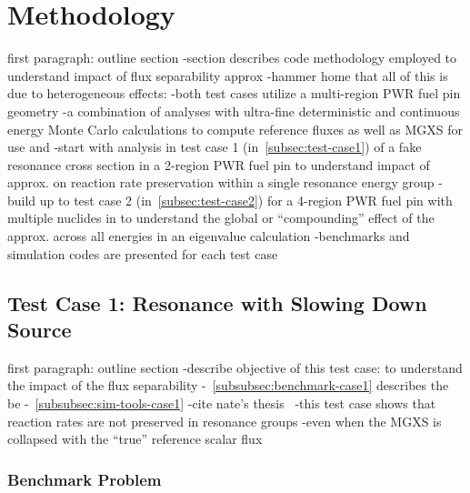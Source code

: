 \section{Methodology}
\label{sec:methodology}

first paragraph: outline section
-section describes code methodology employed to understand impact of flux separability approx 
-hammer home that all of this is due to heterogeneous effects:
  -both test cases utilize a multi-region PWR fuel pin geometry
-a combination of analyses with ultra-fine deterministic and continuous energy Monte Carlo calculations to compute reference fluxes as well as MGXS for use and
-start with analysis in test case 1 (in~\autoref{subsec:test-case1}) of a fake resonance cross section in a 2-region PWR fuel pin to understand impact of approx. on reaction rate preservation within a single resonance energy group
-build up to test case 2 (in~\autoref{subsec:test-case2}) for a 4-region PWR fuel pin with multiple nuclides in to understand the global or ``compounding'' effect of the approx. across all energies in an eigenvalue calculation
-benchmarks and simulation codes are presented for each test case


\subsection{Test Case 1: Resonance with Slowing Down Source}
\label{subsec:test-case1}

first paragraph: outline section
-describe objective of this test case: to understand the impact of the flux separability 
-~\autoref{subsubsec:benchmark-case1} describes the be
-~\autoref{subsubsec:sim-tools-case1}
-cite nate's thesis~\cite{gibson2016thesis}
-this test case shows that reaction rates are not preserved in resonance groups
  -even when the MGXS is collapsed with the ``true'' reference scalar flux

\subsubsection{Benchmark Problem}
\label{subsubsec:benchmark-case1}


